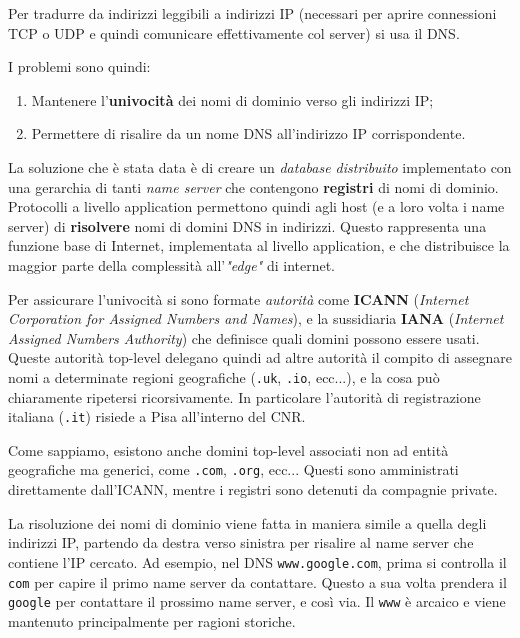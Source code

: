 \documentclass[a4paper,11pt]{article}
\begin{document}
Per tradurre da indirizzi leggibili a indirizzi IP (necessari per aprire connessioni TCP o UDP e quindi comunicare effettivamente col server) si usa il DNS.

I problemi sono quindi:
\begin{enumerate}
	\item Mantenere l'\textbf{univocità} dei nomi di dominio verso gli indirizzi IP;
	\item Permettere di risalire da un nome DNS all'indirizzo IP corrispondente.
\end{enumerate}

La soluzione che è stata data è di creare un \textit{database distribuito} implementato con una gerarchia di tanti \textit{name server} che contengono \textbf{registri} di nomi di dominio. Protocolli a livello application permettono quindi agli host (e a loro volta i name server) di \textbf{risolvere} nomi di domini DNS in indirizzi.
Questo rappresenta una funzione base di Internet, implementata al livello application, e che distribuisce la maggior parte della complessità all'\textit{"edge"} di internet.

Per assicurare l'univocità si sono formate \textit{autorità} come \textbf{ICANN} (\textit{Internet Corporation for Assigned Numbers and Names}), e la sussidiaria \textbf{IANA} (\textit{Internet Assigned Numbers Authority}) che definisce quali domini possono essere usati.
Queste autorità top-level delegano quindi ad altre autorità il compito di assegnare nomi a determinate regioni geografiche (\lstinline|.uk|, \lstinline|.io|, ecc...), e la cosa può chiaramente ripetersi ricorsivamente.
In particolare l'autorità di registrazione italiana (\lstinline|.it|) risiede a Pisa all'interno del CNR. 

Come sappiamo, esistono anche domini top-level associati non ad entità geografiche ma generici, come \lstinline|.com|, \lstinline|.org|, ecc...
Questi sono amministrati direttamente dall'ICANN, mentre i registri sono detenuti da compagnie private.

La risoluzione dei nomi di dominio viene fatta in maniera simile a quella degli indirizzi IP, partendo da destra verso sinistra per risalire al name server che contiene l'IP cercato.
Ad esempio, nel DNS \lstinline|www.google.com|, prima si controlla il \lstinline|com| per capire il primo name server da contattare. Questo a sua volta prendera il \lstinline|google| per contattare il prossimo name server, e così via.
Il \lstinline|www| è arcaico e viene mantenuto principalmente per ragioni storiche.
\end{document}
